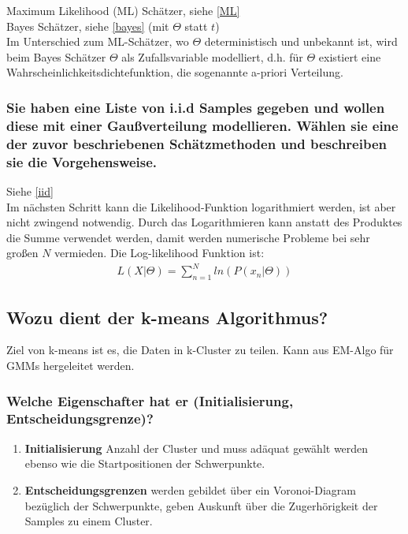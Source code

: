 \documentclass[12pt]{scrartcl}
\begin{document}
Maximum Likelihood (ML) Schätzer, siehe \ref{ML} \\
Bayes Schätzer, siehe \ref{bayes} (mit $\Theta$ statt $t$) \\
Im Unterschied zum ML-Schätzer, wo $\Theta$ deterministisch und unbekannt ist, wird beim Bayes Schätzer $\Theta$ als Zufallsvariable modelliert, d.h. für $\Theta$ existiert eine Wahrscheinlichkeitsdichtefunktion, die sogenannte a-priori Verteilung.

\subsubsection{Sie haben eine Liste von i.i.d Samples gegeben und wollen diese mit einer Gaußverteilung modellieren. Wählen sie eine der zuvor beschriebenen Schätzmethoden und beschreiben sie die Vorgehensweise.}

Siehe \ref{iid} \\
Im nächsten Schritt kann die Likelihood-Funktion logarithmiert werden, ist aber nicht zwingend notwendig. Durch das Logarithmieren kann anstatt des Produktes die Summe verwendet werden, damit werden numerische Probleme bei sehr großen $N$ vermieden. Die Log-likelihood Funktion ist:
\begin{align*}
L(X|\Theta) = \sum_{n=1}^N ln( P(x_n|\Theta))
\end{align*}

\subsection{Wozu dient der k-means Algorithmus?}

Ziel von k-means ist es, die Daten in k-Cluster zu teilen. Kann aus EM-Algo für GMMs hergeleitet werden.

\subsubsection{Welche Eigenschafter hat er (Initialisierung, Entscheidungsgrenze)?}
\begin{enumerate}
\item {\bf Initialisierung} Anzahl der Cluster und muss adäquat gewählt werden ebenso wie die Startpositionen der Schwerpunkte.
\item {\bf Entscheidungsgrenzen} werden gebildet über ein Voronoi-Diagram bezüglich der Schwerpunkte, geben Auskunft über die Zugerhörigkeit der Samples zu einem Cluster.
\end{enumerate}
\end{document}
